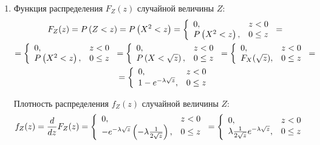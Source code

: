 \begin{enumerate}
    \item Функция распределения $F_Z(z)$ случайной величины $Z$:
    \begin{multline}
        F_Z(z) = P \left ( Z < z \right ) = P \left ( X^2 < z \right )
        = \left \{
        \begin{array}{ll}
            0,                     & z < 0   \\
            P \left ( X^2 < z \right ), & 0 \le z
        \end{array}
        \right . = \\
        = \left \{
        \begin{array}{ll}
            0,                     & z < 0   \\
            P \left ( X^2 < z \right ), & 0 \le z
        \end{array}
        \right .
        = \left \{
        \begin{array}{ll}
            0,                          & z < 0   \\
            P \left ( X < \sqrt{z} \right ), & 0 \le z
        \end{array}
        \right .
        = \left \{
        \begin{array}{ll}
            0,             & z < 0   \\
            F_X(\sqrt{z}), & 0 \le z
        \end{array}
        \right . = \\
        = \left \{
        \begin{array}{ll}
            0,                          & z < 0   \\
            1 - e^{- \lambda \sqrt{z}}, & 0 \le z
        \end{array}
        \right .
    \end{multline}

    Плотность распределения $f_Z(z)$ случайной величины $Z$:
    \begin{equation}
        f_Z(z)
        = \frac{d}{dz} F_Z(z)
        = \left \{
        \begin{array}{ll}
            0,                                                                        & z < 0   \\
            - e^{- \lambda \sqrt{z}} \left ( - \lambda \frac{1}{2 \sqrt{z}} \right ), & 0 \le z
        \end{array}
        \right .
        = \left \{
        \begin{array}{ll}
            0,                                                   & z < 0   \\
            \lambda \frac{1}{2 \sqrt{z}} e^{- \lambda \sqrt{z}}, & 0 \le z
        \end{array}
        \right .
    \end{equation}


\end{enumerate}
